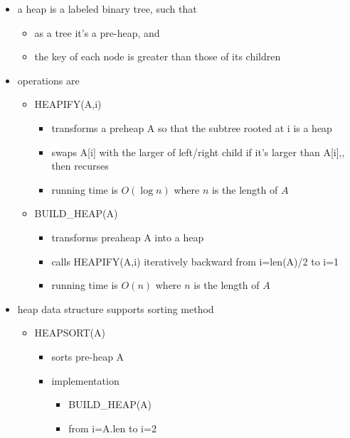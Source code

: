 \documentclass[
]{article}
\providecommand{\tightlist}{%
  \setlength{\itemsep}{0pt}\setlength{\parskip}{0pt}}
\begin{document}
\begin{itemize}
\tightlist
\item
  a heap is a labeled binary tree, such that

  \begin{itemize}
  \tightlist
  \item
    as a tree it's a pre-heap, and
  \item
    the key of each node is greater than those of its children
  \end{itemize}
\item
  operations are

  \begin{itemize}
  \tightlist
  \item
    HEAPIFY(A,i)

    \begin{itemize}
    \tightlist
    \item
      transforms a preheap A so that the subtree rooted at i is a heap
    \item
      swaps A{[}i{]} with the larger of left/right child if it's larger
      than A{[}i{]},, then recurses
    \item
      running time is \(O(\log n)\) where \(n\) is the length of \(A\)
    \end{itemize}
  \item
    BUILD\_HEAP(A)

    \begin{itemize}
    \tightlist
    \item
      transforms preaheap A into a heap
    \item
      calls HEAPIFY(A,i) iteratively backward from i=len(A)/2 to i=1
    \item
      running time is \(O(n)\) where \(n\) is the length of \(A\)
    \end{itemize}
  \end{itemize}
\item
  heap data structure supports sorting method

  \begin{itemize}
  \tightlist
  \item
    HEAPSORT(A)

    \begin{itemize}
    \tightlist
    \item
      sorts pre-heap A
    \item
      implementation

      \begin{itemize}
      \tightlist
      \item
        BUILD\_HEAP(A)
      \item
        from i=A.len to i=2


\end{itemize}
\end{itemize}
\end{itemize}
\end{itemize}
\end{document}
